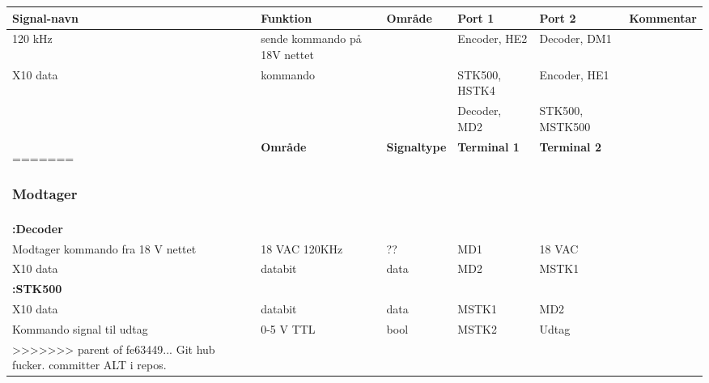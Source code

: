 \begin{table}[htbp]
\begin{tabular}{|p{2cm}|p{2cm}|p{2cm}|p{2cm}|p{2cm}|p{}|}
\hline
\textbf{Signal-navn} & \textbf{Funktion} & \textbf{Område} & \textbf{Port 1} & \textbf{Port 2} & \textbf{Kommentar} \\ \hline

120 kHz & sende kommando på 18V nettet & & Encoder, HE2 & Decoder, DM1 & \\ \hline

X10 data & kommando & & STK500, HSTK4 & Encoder, HE1 & \\
&&& Decoder, MD2 & STK500, MSTK500 &\\ \hline
=======
\subsubsection{Modtager}
\begin{tabular}{|p{3cm}|p{}|p{}|p{}|p{}|}
\hline 
\textbf{Funktion} &\textbf{Område} &\textbf{Signaltype} &\textbf{Terminal 1} &\textbf{Terminal 2} \\ 
\hline 
\multicolumn{5}{|l|}{\textbf{:Decoder}} \\ 
\hline 
Modtager kommando fra 18 V nettet &18 VAC \newline 120KHz &?? &MD1 &18 VAC\\ 
\hline 
X10 data &databit &data &MD2 &MSTK1\\ 
\hline 
\multicolumn{5}{|l|}{\textbf{:STK500}} \\ 
\hline 
X10 data &databit &data &MSTK1 &MD2\\ 
\hline 
Kommando signal til udtag  &0-5 V TTL &bool &MSTK2 &Udtag\\ 
\hline 
>>>>>>> parent of fe63449... Git hub fucker. committer ALT i repos.

\end{tabular} 
\end{table}
